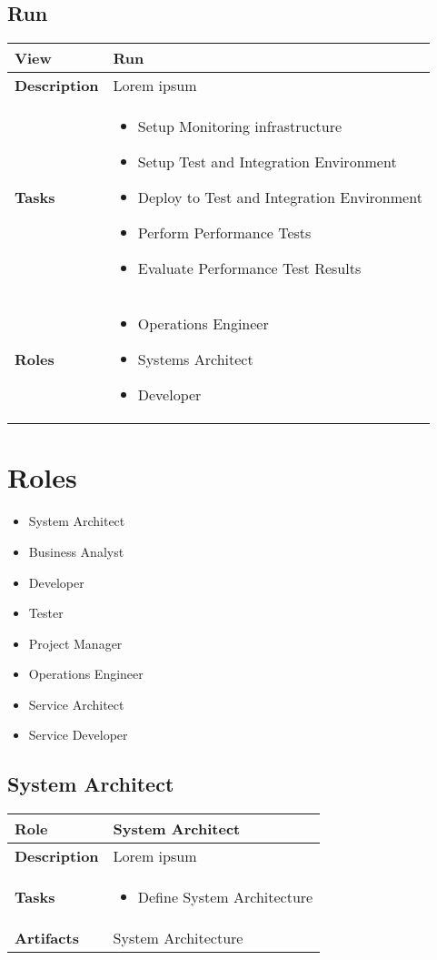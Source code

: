 \subsection{Run}

\label{table:ch6_View_Run}
\begin{tabular}
	{|m{2cm}|m{10cm}|} \hline \bfseries View & Run\\
	\hline \bfseries Description & Lorem ipsum\\
	\hline \bfseries Tasks & 
	\begin{itemize}
		\item Setup Monitoring infrastructure
		\item Setup Test and Integration Environment
		\item Deploy to Test and Integration Environment
		\item Perform Performance Tests
		\item Evaluate Performance Test Results
	\end{itemize}
	\\
	\hline \bfseries Roles &
	\begin{itemize}
		\item Operations Engineer
		\item Systems Architect
		\item Developer
	\end{itemize}
	\\
	\hline 
\end{tabular}

\section{Roles} 
\begin{itemize}
	\item System Architect 
	\item Business Analyst 
	\item Developer 
	\item Tester 
	\item Project Manager 
	\item Operations Engineer 
	\item Service Architect 
	\item Service Developer
\end{itemize}

\subsection{System Architect} 
	\label{table:ch6_Role_System_Architect}
\begin{tabular}
	{|m{2cm}|m{10cm}|} \hline \bfseries Role & System Architect\\
	\hline \bfseries Description & Lorem ipsum\\
	\hline \bfseries Tasks & 
	\begin{itemize}
		\item Define System Architecture 
	\end{itemize}
	\\
	\hline \bfseries Artifacts & System Architecture\\
	\hline 
\end{tabular}

